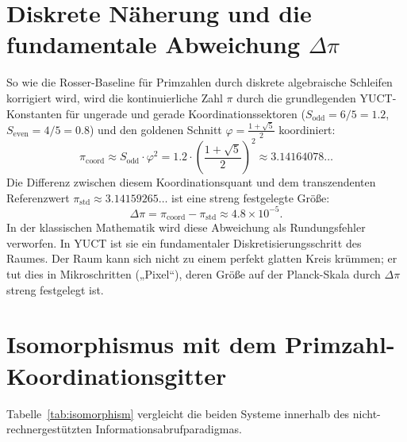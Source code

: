 \documentclass[12pt,a4paper]{article}
\newcommand{\Sodd}{S_{\mathrm{odd}}}
\newcommand{\Seven}{S_{\mathrm{even}}}
\begin{document}
	\section{Diskrete Näherung und die fundamentale Abweichung $\Delta\pi$}
	\label{sec:delta-pi}
	
	So wie die Rosser-Baseline für Primzahlen durch diskrete algebraische Schleifen korrigiert wird, wird die kontinuierliche Zahl $\pi$ durch die grundlegenden YUCT-Konstanten für ungerade und gerade Koordinationssektoren ($\Sodd = 6/5 = 1.2$, $\Seven = 4/5 = 0.8$) und den goldenen Schnitt $\varphi = \frac{1+\sqrt{5}}{2}$ koordiniert:
	\begin{equation}
		\pi_{\mathrm{coord}} \approx \Sodd \cdot \varphi^2 = 1.2 \cdot \left(\frac{1+\sqrt{5}}{2}\right)^2 \approx 3.14164078\ldots
		\label{eq:pi-approx}
	\end{equation}
	Die Differenz zwischen diesem Koordinationsquant und dem transzendenten Referenzwert $\pi_{\mathrm{std}} \approx 3.14159265\ldots$ ist eine streng festgelegte Größe:
	\begin{equation}
		\Delta\pi = \pi_{\mathrm{coord}} - \pi_{\mathrm{std}} \approx 4.8 \times 10^{-5}.
		\label{eq:delta-pi-val}
	\end{equation}
	In der klassischen Mathematik wird diese Abweichung als Rundungsfehler verworfen. In YUCT ist sie ein fundamentaler Diskretisierungsschritt des Raumes. Der Raum kann sich nicht zu einem perfekt glatten Kreis krümmen; er tut dies in Mikroschritten („Pixel“), deren Größe auf der Planck-Skala durch $\Delta\pi$ streng festgelegt ist.
	
	\section{Isomorphismus mit dem Primzahl-Koordinationsgitter}
	\label{sec:isomorphism}
	
	Tabelle~\ref{tab:isomorphism} vergleicht die beiden Systeme innerhalb des nicht-rechnergestützten Informationsabrufparadigmas.
	
\end{document}
